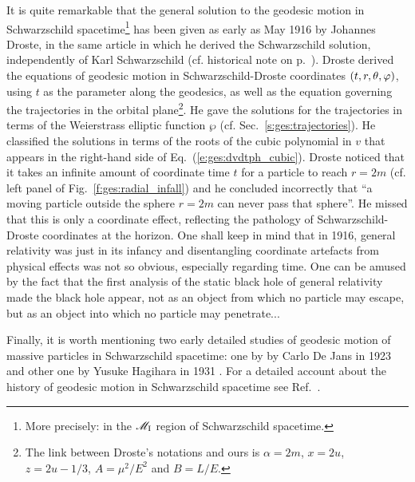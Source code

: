 \begin{hist}
It is quite remarkable that the general solution to the geodesic motion
in Schwarzschild spacetime\footnote{More precisely: in the $\mathscr{M}_{\rm I}$ region
of Schwarzschild spacetime.} has been given as early as May 1916 by
Johannes Droste, in the same article \cite{Drost1917} in which
he derived the Schwarzschild solution, independently of Karl Schwarzschild
(cf. historical note on p.~\pageref{h:sch:Schwarzschild_sol}).
Droste derived the equations of geodesic motion in Schwarzschild-Droste coordinates
$(t, r, \theta,\varphi)$, using $t$ as the parameter
along the geodesics, as well as the equation governing
the trajectories in the orbital plane\footnote{The link between Droste's notations
and ours is $\alpha=2m$, $x=2u$, $z = 2u - 1/3$, $A = \mu^2/E^2$ and $B= L/E$.}.
He gave the solutions for the trajectories
in terms of the Weierstrass elliptic function $\wp$ (cf. Sec.~\ref{s:ges:trajectories}).
He classified the solutions in terms of the roots of the cubic polynomial
in $v$ that appears in the right-hand side of Eq.~(\ref{e:ges:dvdtph_cubic}).
Droste noticed that it takes an infinite amount of coordinate time $t$ for a particle
to reach $r=2m$ (cf. left panel of Fig.~\ref{f:ges:radial_infall}) and
he concluded incorrectly that ``a moving particle outside the sphere $r=2m$ can
never pass that sphere''. He missed that this is only a coordinate effect,
reflecting the pathology of Schwarzschild-Droste coordinates at the horizon.
One shall keep in mind that in 1916, general relativity was just in its infancy
and disentangling coordinate artefacts from physical effects was not so obvious,
especially regarding time.
One can be amused by the fact that the first analysis of the static
black hole of general relativity made the black hole appear, not as an object
from which no particle may escape, but as an object into which no particle
may penetrate...

Finally, it is worth mentioning two early detailed studies of geodesic motion
of massive particles in Schwarzschild spacetime: one by
by Carlo De Jans in 1923 \cite{DeJan1923} and other one by
Yusuke Hagihara in 1931 \cite{Hagih1931}.
For a detailed account about the history of geodesic motion in
Schwarzschild spacetime see Ref.~\cite{Eisen87}.
\end{hist}








